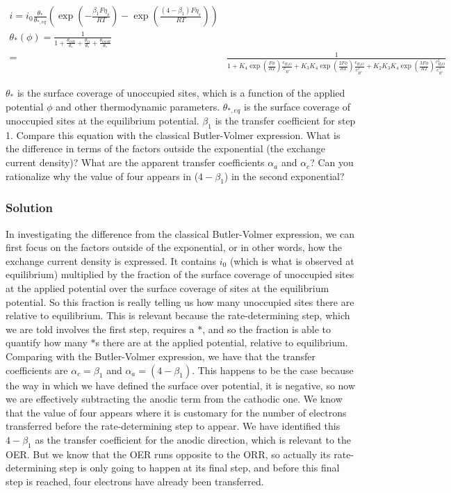 \documentclass[12pt]{article}
\begin{document}
$$
\begin{aligned}
i=i_{0} \frac{\theta_{*}}{\theta_{*, e q}}\left(\exp \left(-\frac{\beta_{1} F \eta_{s}}{R T}\right)-\exp \left(\frac{\left(4-\beta_{1}\right) F \eta_{s}}{R T}\right)\right) \\
\theta_{*}(\phi)=\frac{1}{1+\frac{\theta_{O H}}{\theta_{*}}+\frac{\theta_{O}}{\theta_{*}}+\frac{\theta_{O O H}}{\theta_{*}}}  \\
= & \frac{1}{1+K_{4} \exp \left(\frac{F \phi}{R T}\right) \frac{c_{H_{2} O}}{c_{H^{+}}}+K_{3} K_{4} \exp \left(\frac{2 F \phi}{R T}\right) \frac{c_{H_{2} O}}{c_{H^{+}}^{2}}+K_{2} K_{3} K_{4} \exp \left(\frac{3 F \phi}{R T}\right) \frac{c_{H_{2} O}^{2}}{c_{H^{+}}^{3}}}
\end{aligned}
$$

$\theta_{*}$ is the surface coverage of unoccupied sites, which is a function of the applied potential $\phi$ and other thermodynamic parameters. $\theta_{*, eq}$ is the surface coverage of unoccupied sites at the equilibrium potential. $\beta_{1}$ is the transfer coefficient for step 1. Compare this equation with the classical Butler-Volmer expression. What is the difference in terms of the factors outside the exponential (the exchange current density)? What are the apparent transfer coefficients $\alpha_{a}$ and $\alpha_{c}$? Can you rationalize why the value of four appears in ($4 - \beta_{1}$) in the second exponential?

\subsubsection{Solution}
In investigating the difference from the classical Butler-Volmer expression, we can first focus on the factors outside of the exponential, or in other words, how the exchange current density is expressed. It contains $i_0$ (which is what is observed at equilibrium) multiplied by the fraction of the surface coverage of unoccupied sites at the applied potential over the surface coverage of sites at the equilibrium potential. So this fraction is really telling us how many unoccupied sites there are relative to equilibrium. This is relevant because the rate-determining step, which we are told involves the first step, requires a $*$,  and so the fraction is able to quantify how many $*$s there are at the applied potential, relative to equilibrium. Comparing with the Butler-Volmer expression, we have that the transfer coefficients are $\alpha_{c} = \beta_{1}$ and $\alpha_{a} = \left( 4- \beta_{1} \right)$. This happens to be the case because the way in which we have defined the surface over potential, it is negative, so now we are effectively subtracting the anodic term from the cathodic one. We know that the value of four appears where it is customary for the number of electrons transferred before the rate-determining step to appear. We have identified this $4 - \beta_{1}$ as the transfer coefficient for the anodic direction, which is relevant to the OER. But we know that the OER runs opposite to the ORR, so actually its rate-determining step is only going to happen at its final step, and before this final step is reached, four electrons have already been transferred.
\end{document}

